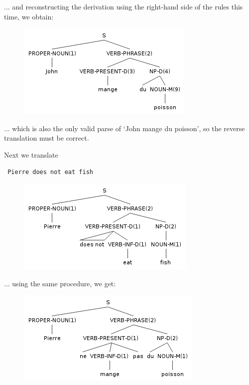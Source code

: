 \documentclass[11pt]{article}
\begin{document}
... and reconstructing the derivation using the right-hand side of the rules this time, we obtain:

\begin{figure}[H]
\includegraphics[scale=0.8]{john-mange-du-poisson.png}
\end{figure}

... which is also the only valid parse of `John mange du poisson', so the reverse translation must be correct.

Next we translate \begin{verbatim} Pierre does not eat fish \end{verbatim}

\begin{figure}[H]
\includegraphics[scale=0.8]{pierre-does-not-eat-fish.png}
\end{figure}

... using the same procedure, we get:

\begin{figure}[H]
\includegraphics[scale=0.8]{pierre-ne-mange-pas-du-poisson.png}
\end{figure}
\end{document}

